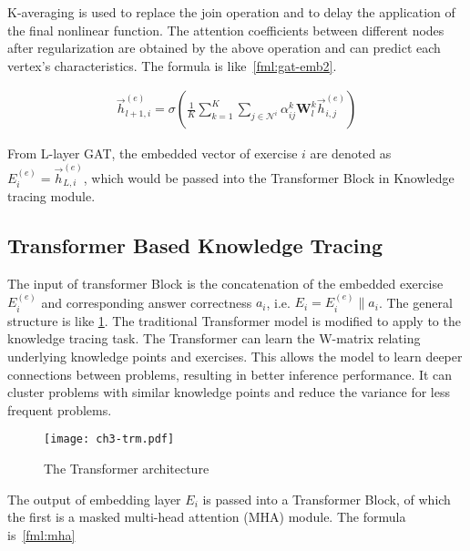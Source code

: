 K-averaging is used to replace the join operation and to delay the application of the final nonlinear function. The attention coefficients between different nodes after regularization are obtained by the above operation and can predict each vertex's characteristics. The formula is like~\ref{fml:gat-emb2}.

\begin{align}
	\overrightarrow{h}^{(e)}_{l+1,i}=\sigma(\frac{1}{K} \sum_{k=1}^{K} \sum_{j \in \mathcal{N}^i} \alpha_{i j}^{k} \mathbf{W}_l^{k} \overrightarrow{h}^{(e)}_{i,j})\label{fml:gat-emb3}
\end{align}

From L-layer GAT, the embedded vector of exercise \(i\) are denoted as \(E^{(e)}_i = \overrightarrow{h}^{(e)}_{L, i}\), which would be passed into the Transformer Block in Knowledge tracing module.

\subsection{Transformer Based Knowledge Tracing}
The input of transformer Block is the concatenation of the embedded exercise \(E^{(e)}_i \) and corresponding answer correctness \(a_i\), i.e. \(E_i=E^{(e)}_i\|a_i\). The general structure is like \figurename{\ref{fig:ch3-fig5}}. The traditional Transformer model is modified to apply to the knowledge tracing task. The Transformer can learn the W-matrix relating underlying knowledge points and exercises. This allows the model to learn deeper connections between problems, resulting in better inference performance. It can cluster problems with similar knowledge points and reduce the variance for less frequent problems.
\begin{figure}[htbp!]
	\centering
	\texttt{[image: ch3-trm.pdf]}
	\caption{The Transformer architecture}
	\label{fig:ch3-fig5}
\end{figure}

The output of embedding layer \(E_i\) is passed into a Transformer Block, of which the first is a masked multi-head attention (MHA) module. The formula is~\ref{fml:mha}

